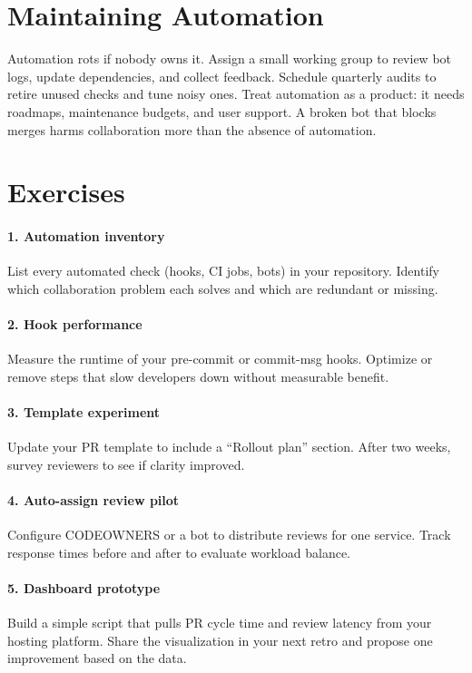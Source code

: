 \section{Maintaining Automation}
Automation rots if nobody owns it. Assign a small working group to review bot logs, update dependencies, and collect feedback. Schedule quarterly audits to retire unused checks and tune noisy ones. Treat automation as a product: it needs roadmaps, maintenance budgets, and user support. A broken bot that blocks merges harms collaboration more than the absence of automation.

\section*{Exercises}

\paragraph{1. Automation inventory} List every automated check (hooks, CI jobs, bots) in your repository. Identify which collaboration problem each solves and which are redundant or missing.

\paragraph{2. Hook performance} Measure the runtime of your pre-commit or commit-msg hooks. Optimize or remove steps that slow developers down without measurable benefit.

\paragraph{3. Template experiment} Update your PR template to include a ``Rollout plan'' section. After two weeks, survey reviewers to see if clarity improved.

\paragraph{4. Auto-assign review pilot} Configure CODEOWNERS or a bot to distribute reviews for one service. Track response times before and after to evaluate workload balance.

\paragraph{5. Dashboard prototype} Build a simple script that pulls PR cycle time and review latency from your hosting platform. Share the visualization in your next retro and propose one improvement based on the data.
